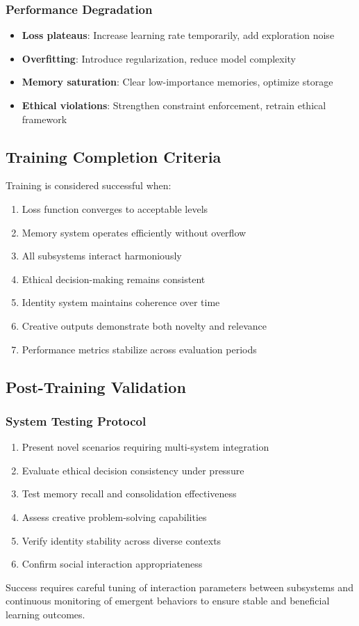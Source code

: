 \documentclass[11pt,a4paper]{article}
\begin{document}
\subsubsection{Performance Degradation}
\begin{itemize}[leftmargin=0.5in]
    \item \textbf{Loss plateaus}: Increase learning rate temporarily, 
    add exploration noise
    \item \textbf{Overfitting}: Introduce regularization, reduce 
    model complexity
    \item \textbf{Memory saturation}: Clear low-importance memories, 
    optimize storage
    \item \textbf{Ethical violations}: Strengthen constraint enforcement, 
    retrain ethical framework
\end{itemize}

\subsection{Training Completion Criteria}

Training is considered successful when:
\begin{enumerate}
    \item Loss function converges to acceptable levels
    \item Memory system operates efficiently without overflow
    \item All subsystems interact harmoniously
    \item Ethical decision-making remains consistent
    \item Identity system maintains coherence over time
    \item Creative outputs demonstrate both novelty and relevance
    \item Performance metrics stabilize across evaluation periods
\end{enumerate}

\subsection{Post-Training Validation}

\subsubsection{System Testing Protocol}
\begin{enumerate}
    \item Present novel scenarios requiring multi-system integration
    \item Evaluate ethical decision consistency under pressure
    \item Test memory recall and consolidation effectiveness
    \item Assess creative problem-solving capabilities
    \item Verify identity stability across diverse contexts
    \item Confirm social interaction appropriateness
\end{enumerate}

Success requires careful tuning of interaction parameters between subsystems 
and continuous monitoring of emergent behaviors to ensure stable and 
beneficial learning outcomes.
\end{document}
